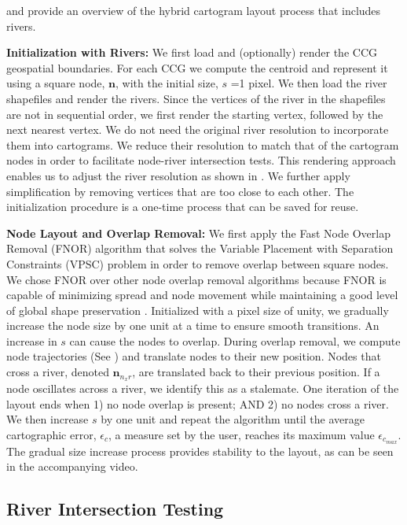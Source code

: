 \documentclass[Afour,sagev,times]{sagej}
\newcommand{\bobgraph}[1]{\noindent\textbf{#1}}
\newcommand{\nodeSize}{s}
\newcommand{\nodeError}{\epsilon}
\newcommand{\nodeCartographicError}{\nodeError_{c}}
\newcommand{\nodeCartographicErrorMax}{\nodeError_{c_{max}}}
\newcommand{\node}{\bm{n}}
\newcommand{\NxR}{\node_{n_{x}r}}
\begin{document}
 and  provide an overview of the hybrid cartogram layout process that includes rivers.

\bobgraph{Initialization with Rivers:} We first load and (optionally) render the CCG geospatial boundaries.
For each CCG we compute the centroid and represent it using a square node, $ \node $, with the initial size, $ \nodeSize $ =1 pixel.
We then load the river shapefiles and render the rivers.
Since the vertices of the river in the shapefiles are not in sequential order, we first render the starting vertex, followed by the next nearest vertex.
We do not need the original river resolution to incorporate them into cartograms.
We reduce their resolution to match that of the cartogram nodes in order to facilitate node-river intersection tests.
This rendering approach enables us to adjust the river resolution as shown in .
We further apply simplification by removing vertices that are too close to each other.
The initialization procedure is a one-time process that can be saved for reuse.


\bobgraph{Node Layout and Overlap Removal:} We first apply the Fast Node Overlap Removal (FNOR) algorithm that solves the Variable Placement with Separation Constraints (VPSC) problem \cite{dwyer2006Fast} in order to remove overlap between square nodes.
We chose FNOR over other node overlap removal algorithms because FNOR is capable of minimizing spread and node movement while maintaining a good level of global shape preservation \cite{chen2020Node}.
Initialized with a pixel size of unity, we gradually increase the node size by one unit at a time to ensure smooth transitions.
An increase in $ \nodeSize $ can cause the nodes to overlap.
During overlap removal, we compute node trajectories (See ) and translate nodes to their new position.
Nodes that cross a river, denoted $ \NxR $, are translated back to their previous position.
If a node oscillates across a river, we identify this as a stalemate.
One iteration of the layout ends when 1) no node overlap is present; AND 2) no nodes cross a river.
We then increase $ \nodeSize $ by one unit and repeat the algorithm until the average cartographic error, $ \nodeCartographicError $, a measure set by the user, reaches its maximum value $ \nodeCartographicErrorMax $.
The gradual size increase process provides stability to the layout, as can be seen in the accompanying video.

\subsection{River Intersection Testing}
\label{subsec:{River Intersection Testing}}
\end{document}
